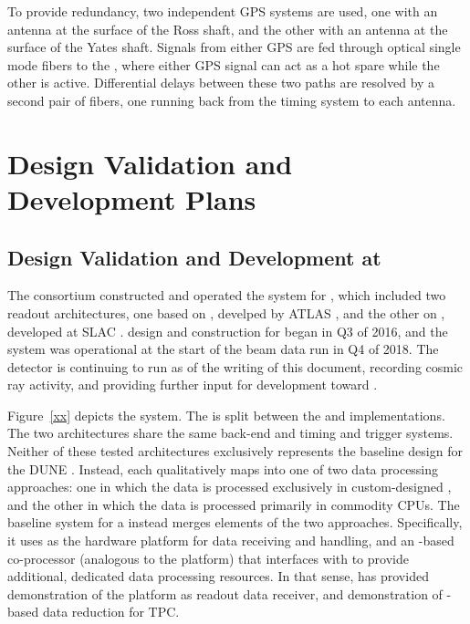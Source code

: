 To provide redundancy, two independent GPS systems are used,
one with an antenna at the surface of the Ross shaft, and the other
with an antenna at the surface of the Yates shaft. Signals from either
GPS are fed through optical single mode fibers to the , where
either GPS signal can act as a hot spare while the other is active. 
Differential delays between these two paths are resolved by a second pair of fibers, one running back from the timing system to each antenna.


\section{Design Validation and Development Plans}
\label{sec:fd-daq:validation}

\subsection{Design Validation and Development at }

\label{sec:fd-daq:protodune}

The   consortium constructed and operated the  system for
, which included %
two  readout 
architectures, one based on , develped by ATLAS \cite{xx}, and the other on , developed at
SLAC \cite{xx}.  design and construction for
 began in Q3 of 2016, and the system was operational at the start of the beam data run %
in Q4 of 2018. The detector is
continuing to run as of the writing of this document, recording cosmic
ray activity, and %
providing further input for  development toward
. 

Figure~\ref{xx} depicts the   system.  The  is split %
between the    and  implementations. The two architectures share the same back-end and
timing and trigger systems. 
Neither of these tested %
architectures %
exclusively represents the
baseline design for the DUNE . Instead, each %
qualitatively maps into one of
two data processing approaches: one in which the data is processed
exclusively in
custom-designed , and the other  in which the data is processed primarily in commodity
CPUs. The baseline system for a %
 instead
merges elements of the two approaches. Specifically, it uses    as
the hardware platform for data receiving and handling, and an
-based co-processor (analogous to the  platform) that
interfaces with    to provide additional, dedicated data processing
resources. In that sense, has provided demonstration of the
   platform as  readout data receiver, and
demonstration of -based data reduction for TPC.

